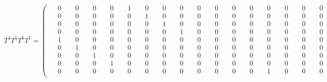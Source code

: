 \documentclass[10pt]{article}
\begin{document}
\[
T^4T^5T^6T^7 = \left(\begin{smallmatrix}
\phantom{-}0 & \phantom{-}0 & \phantom{-}0 & \phantom{-}0 & \phantom{-}1 & \phantom{-}0 & \phantom{-}0 & \phantom{-}0 & \phantom{-}0 & \phantom{-}0 & \phantom{-}0 & \phantom{-}0 & \phantom{-}0 & \phantom{-}0 & \phantom{-}0 & \phantom{-}0 \\
\phantom{-}0 & \phantom{-}0 & \phantom{-}0 & \phantom{-}0 & \phantom{-}0 & \phantom{-}1 & \phantom{-}0 & \phantom{-}0 & \phantom{-}0 & \phantom{-}0 & \phantom{-}0 & \phantom{-}0 & \phantom{-}0 & \phantom{-}0 & \phantom{-}0 & \phantom{-}0 \\
\phantom{-}0 & \phantom{-}0 & \phantom{-}0 & \phantom{-}0 & \phantom{-}0 & \phantom{-}0 & \phantom{-}1 & \phantom{-}0 & \phantom{-}0 & \phantom{-}0 & \phantom{-}0 & \phantom{-}0 & \phantom{-}0 & \phantom{-}0 & \phantom{-}0 & \phantom{-}0 \\
\phantom{-}0 & \phantom{-}0 & \phantom{-}0 & \phantom{-}0 & \phantom{-}0 & \phantom{-}0 & \phantom{-}0 & \phantom{-}1 & \phantom{-}0 & \phantom{-}0 & \phantom{-}0 & \phantom{-}0 & \phantom{-}0 & \phantom{-}0 & \phantom{-}0 & \phantom{-}0 \\
\phantom{-}1 & \phantom{-}0 & \phantom{-}0 & \phantom{-}0 & \phantom{-}0 & \phantom{-}0 & \phantom{-}0 & \phantom{-}0 & \phantom{-}0 & \phantom{-}0 & \phantom{-}0 & \phantom{-}0 & \phantom{-}0 & \phantom{-}0 & \phantom{-}0 & \phantom{-}0 \\
\phantom{-}0 & \phantom{-}1 & \phantom{-}0 & \phantom{-}0 & \phantom{-}0 & \phantom{-}0 & \phantom{-}0 & \phantom{-}0 & \phantom{-}0 & \phantom{-}0 & \phantom{-}0 & \phantom{-}0 & \phantom{-}0 & \phantom{-}0 & \phantom{-}0 & \phantom{-}0 \\
\phantom{-}0 & \phantom{-}0 & \phantom{-}1 & \phantom{-}0 & \phantom{-}0 & \phantom{-}0 & \phantom{-}0 & \phantom{-}0 & \phantom{-}0 & \phantom{-}0 & \phantom{-}0 & \phantom{-}0 & \phantom{-}0 & \phantom{-}0 & \phantom{-}0 & \phantom{-}0 \\
\phantom{-}0 & \phantom{-}0 & \phantom{-}0 & \phantom{-}1 & \phantom{-}0 & \phantom{-}0 & \phantom{-}0 & \phantom{-}0 & \phantom{-}0 & \phantom{-}0 & \phantom{-}0 & \phantom{-}0 & \phantom{-}0 & \phantom{-}0 & \phantom{-}0 & \phantom{-}0 \\
\phantom{-}0 & \phantom{-}0 & \phantom{-}0 & \phantom{-}0 & \phantom{-}0 & \phantom{-}0 & \phantom{-}0 & \phantom{-}0 & \phantom{-}0 & \phantom{-}0 & \phantom{-}0 & \phantom{-}0 & \phantom{-}1 & \phantom{-}0 & \phantom{-}0 & \phantom{-}0 \\

\end{smallmatrix}\]
\end{document}
